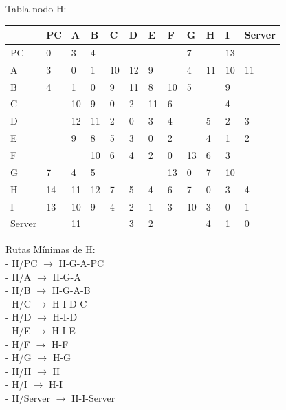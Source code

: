 \documentclass[a4paper]{article}
\begin{document}
\begin{table}[ht]
Tabla nodo H:\\
\begin{tabular}{|l|l|l|l|l|l|l|l|l|l|l|l|}
\hline
       & PC & A  & B & C & D & E & F & G & H & I  & Server \\ \hline
PC     & 0  & 3  & 4 &   &   &   &   & 7 &   & 13 &        \\ \hline
A      & 3  & 0  & 1 & 10& 12& 9 &   & 4 & 11& 10 & 11     \\ \hline
B      & 4  & 1  & 0 & 9 & 11& 8 & 10& 5 &   & 9  &        \\ \hline
C      &    & 10 & 9 & 0 & 2 & 11& 6 &   &   & 4  &        \\ \hline
D      &    & 12 & 11& 2 & 0 & 3 & 4 &   & 5 & 2  & 3      \\ \hline
E      &    & 9  & 8 & 5 & 3 & 0 & 2 &   & 4 & 1  & 2      \\ \hline
F      &    &    & 10& 6 & 4 & 2 & 0 & 13& 6 & 3  &        \\ \hline
G      & 7  & 4  & 5 &   &   &   & 13& 0 & 7 & 10 &        \\ \hline
H      & 14 & 11 & 12& 7 & 5 & 4 & 6 & 7 & 0 & 3  & 4      \\ \hline
I      & 13 & 10 & 9 & 4 & 2 & 1 & 3 & 10& 3 & 0  & 1      \\ \hline
Server &    & 11 &   &   & 3 & 2 &   &   & 4 & 1  & 0      \\ \hline
\end{tabular}

Rutas Mínimas de H:\\
-	H/PC $\rightarrow$  H-G-A-PC\\
-	H/A  $\rightarrow$ H-G-A\\
-	H/B  $\rightarrow$  H-G-A-B\\
-	H/C  $\rightarrow$  H-I-D-C\\
-	H/D  $\rightarrow$  H-I-D\\
-	H/E  $\rightarrow$  H-I-E\\
-	H/F  $\rightarrow$  H-F\\
-	H/G  $\rightarrow$  H-G\\
-	H/H  $\rightarrow$  H\\
-	H/I  $\rightarrow$  H-I\\
-	H/Server  $\rightarrow$  H-I-Server\\
\end{table}

\clearpage
\end{document}
